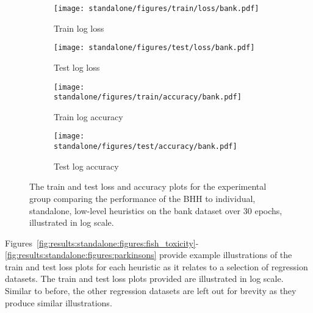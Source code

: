 \begin{figure}[htpb]
      \begin{subfigure}{0.5\textwidth}
            \centering
            \texttt{[image: standalone/figures/train/loss/bank.pdf]}
            \caption{Train log loss}
            \label{fig:results:standalone:figures:loss:train:bank}
      \end{subfigure}
      \begin{subfigure}{0.5\textwidth}
            \centering
            \texttt{[image: standalone/figures/test/loss/bank.pdf]}
            \caption{Test log loss}
            \label{fig:results:standalone:figures:loss:test:bank}
      \end{subfigure}
      \par\bigskip
      \par\bigskip
      \begin{subfigure}{0.5\textwidth}
            \centering
            \texttt{[image: standalone/figures/train/accuracy/bank.pdf]}
            \caption{Train log accuracy}
            \label{fig:results:standalone:figures:accuracy:train:bank}
      \end{subfigure}
      \begin{subfigure}{0.5\textwidth}
            \centering
            \texttt{[image: standalone/figures/test/accuracy/bank.pdf]}
            \caption{Test log accuracy}
            \label{fig:results:standalone:figures:accuracy:test:bank}
      \end{subfigure}
      \par\bigskip
      \caption{The train and test loss and accuracy plots for the experimental group comparing the performance of the \acs{BHH} to individual, standalone, low-level heuristics on the bank dataset over 30 epochs, illustrated in log scale.}
      \label{fig:results:standalone:figures:bank}
\end{figure}

Figures~\ref{fig:results:standalone:figures:fish_toxicity}-\ref{fig:results:standalone:figures:parkinsons} provide example illustrations of the train and test loss plots for each heuristic as it relates to a selection of regression datasets. The train and test loss plots provided are illustrated in log scale. Similar to before, the other regression datasets are left out for brevity as they produce similar illustrations.

